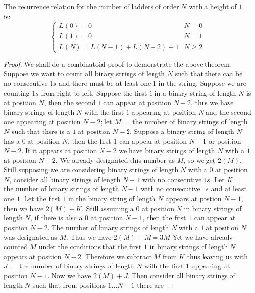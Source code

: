    \begin{theorem}
       The recurrence relation for the number of ladders of order $N$ with a height of $1$ is:
       \[   \left\{
        \begin{array}{ll}
        L(0) = 0 & N = 0 \\
        L(1) = 0 & N=1 \\
        L(N) = L(N-1) + L(N-2) + 1 & N \geq 2 
        \end{array} 
    \right. \]
   \end{theorem}
\begin{proof}
    We shall do a combinatoial proof to demonstrate the above theorem. Suppose we want to count all binary strings of length $N$ such that there 
    can be no consecutive $1s$ and there must be at least one $1$ in the string. Suppose we are counting $1s$ from right to left. Suppose the first $1$ in a binary string of length $N$ is at position $N$, 
    then the second $1$ can appear at position $N-2$, thus we have binary 
    strings of length $N$ with the first $1$ appearing at position $N$ and the second one appearing at position $N-2$; let $M=$ the number of binary strings of length $N$ such that there is a $1$ 
    at position $N-2$. Suppose a binary string of length $N$ has a $0$ at position $N$, then
    the first $1$ can appear at position $N-1$ or position $N-2$. If it appears at position $N-2$ we have binary strings of length $N$ with a $1$ at position $N-2$. 
    We already designated this number as $M$, so we get $2(M)$. 
    Still supposing we are considering binary strings of length $N$ with a $0$ at position $N$, consider all binary strings of length $N-1$ with 
    no consecutive $1s$. Let $K=$ the number of binary strings of length $N-1$ with no consecutive $1s$ and at least one $1$.
    Let the first $1$ in the binary string of length $N$ appears at postion $N-1$, then we have $2(M)+K$. Still assuming a $0$ at position $N$
    in binary strings of length $N$, if there is also a $0$ at position $N-1$, then the first $1$ can appear at position $N-2$. The number of 
    binary strings of length $N$ with a $1$ at position $N$ was designated as $M$. Thus we have $2(M)+M=3M$
    Yet we have already counted $M$ under the conditions that the first $1$ in binary strings of length $N$ appears at position $N-2$. Therefore we subtract 
    $M$ from $K$ thus leaving us with $J=$ the number of binary strings of length $N$ with the first $1$ appearing at position $N-1$. 
    Now we have $2(M)+J$. Then consider all binary strings of length $N$ such that from positions $1\dots N-1$ there are 

\end{proof}
